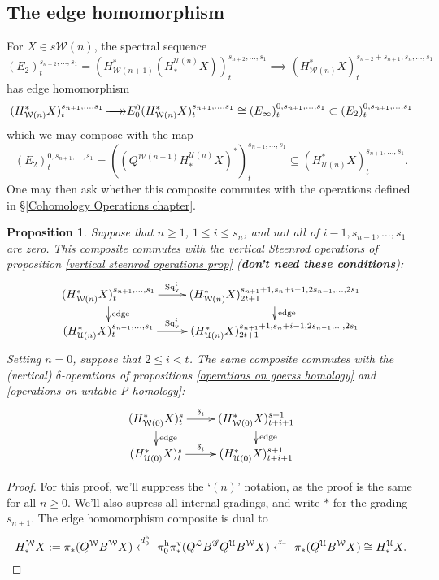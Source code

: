 \documentclass[11pt]{amsart}
\theoremstyle{plain}
\newtheorem{prop}[thm]{Proposition}
\theoremstyle{definition}
\newcommand{\DASH}{\textup{--}}
\renewcommand{\to}{\longrightarrow}
\newcommand{\from}{\longleftarrow}
\newcommand{\scrG}{\mathscr{G}}
\newcommand{\calW}{\mathcal{W}}
\newcommand{\calU}{\mathcal{U}}
\newcommand{\calL}{\mathcal{L}}
\theoremstyle{plain}
\newcommand{\BSW}{{\scrG}}
\newcommand{\epi}{{\,\makebox[0cm][l]{\ensuremath\to}\to}}
\newcommand{\Sq}{\mathrm{Sq}}
\begin{document}
\begin{Composite functor spectral sequences}
\subsection{The edge homomorphism}
For $X\in s\calW(n)$, the spectral sequence
\[(E_2)^{s_{n+2},\ldots,s_1}_t=(H^*_{\calW(n+1)}(H_*^{\calU(n)}X))^{s_{n+2},\ldots,s_1}_t\implies (H^*_{\calW(n)}X)^{s_{n+2}+s_{n+1},s_n,\ldots,s_1}_t\]
has edge homomorphism
\[(H^*_{\calW(n)}X)^{s_{n+1},\ldots,s_{1}}_t\epi
E_0^{0}(H^*_{\calW(n)}X)^{s_{n+1},\ldots,s_{1}}_t\cong (E_\infty)^{0,s_{n+1},\ldots,s_1}_t\subset (E_2)^{0,s_{n+1},\ldots,s_1}_t\]
which we may compose with the map
\[(E_2)^{0,s_{n+1},\ldots,s_1}_t=((Q^{\calW(n+1)}H_*^{\calU(n)}X)^*)^{s_{n+1},\ldots,s_1}_t\subseteq (H^*_{\calU(n)}X)^{s_{n+1},\ldots,s_1}_t.\]
One may then ask whether this composite commutes with the operations defined in \S\ref{Cohomology Operations chapter}.
\begin{prop}
Suppose that $n\geq1$, $1\leq i \leq s_n$, and not all of $i-1,s_{n-1},\ldots,s_1$ are zero. This composite commutes with the vertical Steenrod operations of proposition \ref{vertical steenrod operations prop} (\textbf{don't need these conditions}):
\[\xymatrix@R=4mm{
(H^*_{\calW(n)}X)^{s_{n+1},\ldots,s_1}_t\ar[r]^-{\Sq_\textup{v}^i}
\ar[d]^-{\textup{edge}}
&%
(H^*_{\calW(n)}X)^{s_{n+1}+1,s_n+i-1,2s_{n-1},\ldots,2s_1}_{2t+1}\ar[d]^-{\textup{edge}}
\\%
(H^*_{\calU(n)}X)^{s_{n+1},\ldots,s_1}_t\ar[r]^-{\Sq_\textup{v}^i}
&%
(H^*_{\calU(n)}X)^{s_{n+1}+1,s_n+i-1,2s_{n-1},\ldots,2s_1}_{2t+1}
}\]
Setting $n=0$, suppose that $2\leq i <t$. The same composite commutes with the (vertical) $\delta$-operations of propositions \ref{operations on goerss homology} and \ref{operations on untable P homology}:
\[\xymatrix@R=4mm{
(H^*_{\calW(0)}X)^{s}_t\ar[r]^-{\delta_i}
\ar[d]^-{\textup{edge}}
&%
(H^*_{\calW(0)}X)^{s+1}_{t+i+1}\ar[d]^-{\textup{edge}}
\\%
(H^*_{\calU(0)}X)^{s}_t\ar[r]^-{\delta_i}
&%
(H^*_{\calU(0)}X)^{s+1}_{t+i+1}
}\]
\end{prop}
\begin{proof}For this proof, we'll suppress the `$(n)$' notation, as the proof is the same for all $n\geq0$. We'll also supress all internal gradings, and write $*$ for the grading $s_{n+1}$. The edge homomorphism composite is dual to
\[H_*^{\calW}X:=\pi_*(Q^{\calW}B^{\calW}X)\overset{d_0^\textup{h}}{\from}\pi_0^\textup{h}\pi_*^\textup{v}(Q^{\calL}B^{\BSW} Q^{\calU}B^{\calW}X)\overset{z_{\DASH}}{\from}\pi_*(Q^{\calU}B^{\calW}X)\cong H_*^{\calU}X.\]

\end{proof}
\end{Composite functor spectral sequences}
\end{document}

